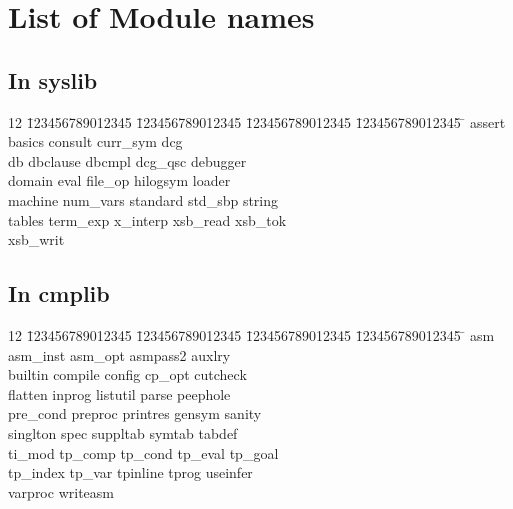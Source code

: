 \chapter{List of Module names} \label{module_names}

\section{In syslib}

\begin{tabbing}
12 \= 123456789012345 \= 123456789012345 \= 123456789012345 \= 123456789012345 \= \kill
\> assert	\> basics	\> consult 	 \> curr\_sym	\> dcg	\\
\> db		\> dbclause	\> dbcmpl	 \> dcg\_qsc	\> debugger \\
\> domain	\> eval		\> file\_op	 \> hilogsym	\> loader \\
\> machine	\> num\_vars	\> standard	\> std\_sbp	 \> string \\
\> tables	\> term\_exp	\> x\_interp	\> xsb\_read	\> xsb\_tok \\
\> xsb\_writ
\end{tabbing}


\section{In cmplib}

\begin{tabbing}
12 \= 123456789012345 \= 123456789012345 \= 123456789012345 \= 123456789012345 \= \kill
 \> asm		\> asm\_inst	\> asm\_opt	\> asmpass2	\> auxlry	\\
 \> builtin	\> compile	\> config	\> cp\_opt	\> cutcheck	\\
 \> flatten	\> inprog	\> listutil	\> parse	\> peephole	\\
 \> pre\_cond	\> preproc	\> printres	\> gensym	\> sanity	\\
 \> singlton	\> spec		\> suppltab	\> symtab	\> tabdef	\\
 \> ti\_mod	\> tp\_comp	\> tp\_cond	\> tp\_eval	\> tp\_goal	\\
 \> tp\_index	\> tp\_var	\> tpinline	\> tprog	\> useinfer	\\
 \> varproc	\> writeasm
\end{tabbing}

